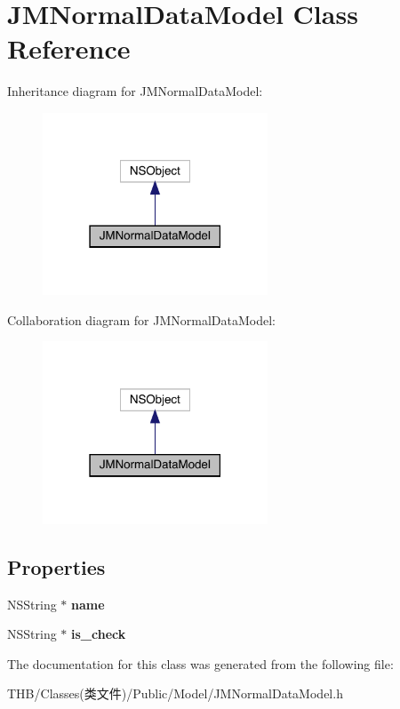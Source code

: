 \hypertarget{interface_j_m_normal_data_model}{}\section{J\+M\+Normal\+Data\+Model Class Reference}
\label{interface_j_m_normal_data_model}


Inheritance diagram for J\+M\+Normal\+Data\+Model\+:\nopagebreak
\begin{figure}[H]
\begin{center}
\leavevmode
\includegraphics[width=190pt]{interface_j_m_normal_data_model__inherit__graph}
\end{center}
\end{figure}


Collaboration diagram for J\+M\+Normal\+Data\+Model\+:\nopagebreak
\begin{figure}[H]
\begin{center}
\leavevmode
\includegraphics[width=190pt]{interface_j_m_normal_data_model__coll__graph}
\end{center}
\end{figure}
\subsection*{Properties}
\begin{DoxyCompactItemize}
\item 
\mbox{\label{interface_j_m_normal_data_model_a81f78b297a7855c1deab05908a347297}} 
N\+S\+String $\ast$ {\bfseries name}
\item 
\mbox{\label{interface_j_m_normal_data_model_a68cd2e4ea38ade33dc0ee0ca815907a3}} 
N\+S\+String $\ast$ {\bfseries is\+\_\+check}
\end{DoxyCompactItemize}


The documentation for this class was generated from the following file\+:\begin{DoxyCompactItemize}
\item 
T\+H\+B/\+Classes(类文件)/\+Public/\+Model/J\+M\+Normal\+Data\+Model.\+h\end{DoxyCompactItemize}
